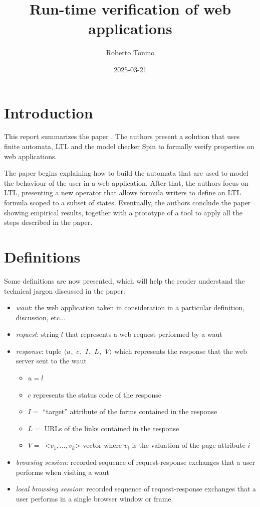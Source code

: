 \documentclass[a4paper,10pt]{article}
\title{Run-time verification of web applications}
\author{Roberto Tonino}
\date{2025-03-21}
\newcommand{\res}[1][]{
  \ifthenelse{\equal{#1}{}}{\mbox{$\langle u$, $c$, $I$, $L$, $V\rangle$}}
  {\mbox{$\langle u_{#1}$, $c_{#1}$, $I_{#1}$, $L_{#1}$, $V_{#1}\rangle$}}
}
\theoremstyle{plain} %
\theoremstyle{definition}
\theoremstyle{remark}
\begin{document}
\maketitle

\tableofcontents

\clearpage

\section{Introduction}

This report summarizes the paper . The authors present a solution that uses finite automata, LTL and the model checker Spin to formally verify properties on web applications.

The paper begins explaining how to build the automata that are used to model the behaviour of the user in a web application. After that, the authors focus on LTL, presenting a new operator that allows formula writers to define an LTL formula scoped to a subset of states. Eventually, the authors conclude the paper showing empirical results, together with a prototype of a tool to apply all the steps described in the paper.

\section{Definitions}

Some definitions are now presented, which will help the reader understand the technical jargon discussed in the paper:

\begin{itemize}
  \item \textit{\gls{waut}}: the web application taken in consideration in a particular definition, discussion, etc...
  \item \textit{request}: string $l$ that represents a web request performed by a \gls{waut}
  \item \textit{response}: tuple \res which represents the response that the web server sent to the \gls{waut}
    \begin{itemize}
      \item $u = l$
      \item $c$ represents the status code of the response \cite{Fielding2022}
      \item $I =$ ``target'' attribute of the forms contained in the response
      \item $L =$ URLs of the links contained in the response
      \item $V =$\ <$v_1,\dots,v_k$> vector where $v_i$ is the valuation of the page attribute $i$
    \end{itemize}
  \item \textit{browsing session}: recorded sequence of request-response exchanges that a user performs when visiting a \gls{waut}
  \item \textit{local browsing session}: recorded sequence of request-response exchanges that a user performs in a single browser window or frame
\end{itemize}
\end{document}
